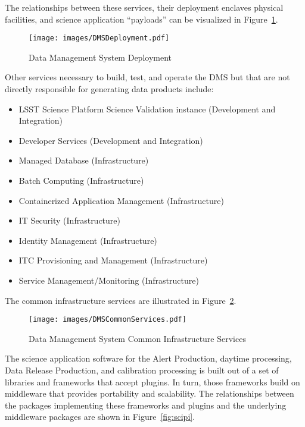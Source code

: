 \documentclass[DM,toc]{lsstdoc}
\begin{document}
The relationships between these services, their deployment enclaves
physical facilities, and science application ``payloads'' can be
visualized in Figure~\ref{fig:deployment}.

\begin{figure}
\centering
\texttt{[image: images/DMSDeployment.pdf]}
\caption{Data Management System Deployment}
\label{fig:deployment}
\end{figure}

Other services necessary to build, test, and operate the DMS but that are not directly responsible for generating data products include:
\begin{itemize}
\item
  LSST Science Platform Science Validation instance (Development and Integration)
\item
  Developer Services (Development and Integration)
\item
  Managed Database (Infrastructure)
\item
  Batch Computing (Infrastructure)
\item
  Containerized Application Management (Infrastructure)
\item
  IT Security (Infrastructure)
\item
  Identity Management (Infrastructure)
\item
  ITC Provisioning and Management (Infrastructure)
\item
  Service Management/Monitoring (Infrastructure)
\end{itemize}

The common infrastructure services are illustrated in Figure~\ref{fig:commonservices}.

\begin{figure}
\centering
\texttt{[image: images/DMSCommonServices.pdf]}
\caption{Data Management System Common Infrastructure Services}
\label{fig:commonservices}
\end{figure}

The science application software for the Alert Production, daytime
processing, Data Release Production, and calibration processing is built
out of a set of libraries and frameworks that accept plugins. In turn, those
frameworks build on middleware that provides portability and
scalability.  The relationships between the packages implementing
these frameworks and plugins and the underlying middleware packages
are shown in Figure~\ref{fig:scipi}.
\end{document}
